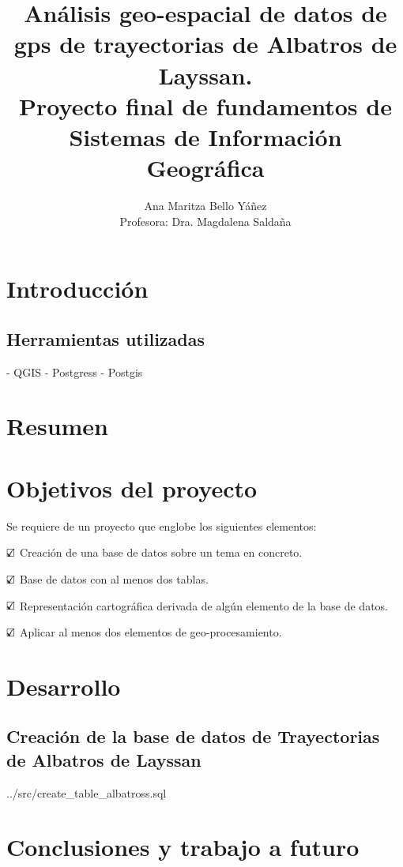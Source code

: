 \documentclass[a4paper, 11pt]{article}
\title{ Análisis geo-espacial de datos de gps de trayectorias de Albatros de
Layssan. \\
Proyecto final de fundamentos de Sistemas de Información Geográfica \\
}
\author{Ana Maritza Bello Yáñez \\ Profesora: Dra. Magdalena Saldaña}
\begin{document}
\maketitle
\tableofcontents

\section{Introducción}

\subsection{Herramientas utilizadas}

- QGIS
- Postgress
- Postgis

\section{Resumen}


\section{Objetivos del proyecto}

Se requiere de un proyecto que englobe los siguientes elementos:

$\text{\rlap{$\checkmark$}}\square$ Creación de una base de datos sobre un tema
en concreto.

$\text{\rlap{$\checkmark$}}\square$ Base de datos con al menos dos tablas.

$\text{\rlap{$\checkmark$}}\square$ Representación cartográfica derivada de
algún elemento de la base de datos.

$\text{\rlap{$\checkmark$}}\square$ Aplicar al menos dos elementos de
geo-procesamiento.


\section{Desarrollo}

\subsection{Creación de la base de datos de Trayectorias de Albatros de Layssan}

 {../src/create_table_albatross.sql}

\section{Conclusiones y trabajo a futuro}


\end{document}
